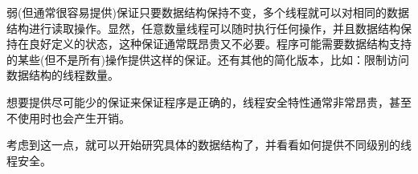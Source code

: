 弱(但通常很容易提供)保证只要数据结构保持不变，多个线程就可以对相同的数据结构进行读取操作。显然，任意数量线程可以随时执行任何操作，并且数据结构保持在良好定义的状态，这种保证通常既昂贵又不必要。程序可能需要数据结构支持的某些(但不是所有)操作提供这样的保证。还有其他的简化版本，比如：限制访问数据结构的线程数量。

想要提供尽可能少的保证来保证程序是正确的，线程安全特性通常非常昂贵，甚至不使用时也会产生开销。

考虑到这一点，就可以开始研究具体的数据结构了，并看看如何提供不同级别的线程安全。

































